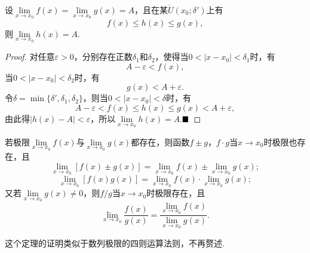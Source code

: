 \begin{theorem}[迫敛性]
	设$\lim\limits_{x\to x_0}f(x)=\lim\limits_{x\to x_0}g(x)=A$，且在某$\mathring{U}(x_0;\delta')$上有
	$$f(x)\leqslant h(x)\leqslant g(x),$$
	则$\lim\limits_{x\to x_0}h(x)=A$.
\end{theorem}
\begin{proof}
	对任意$\varepsilon>0$，分别存在正数$\delta_1$和$\delta_2$，使得当$0<|x-x_0|<\delta_1$时，有
	$$A-\varepsilon<f(x),$$
	当$0<|x-x_0|<\delta_2$时，有
	$$g(x)<A+\varepsilon.$$
	令$\delta=\min\{\delta',\delta_1,\delta_2\}$，则当$0<|x-x_0|<\delta$时，有
	$$A-\varepsilon<f(x)\leqslant h(x)\leqslant g(x)<A+\varepsilon,$$
	由此得$|h(x)-A|<\varepsilon$，所以$\lim\limits_{x\to x_0}h(x)=A$.$\hfill\blacksquare$
\end{proof}
\begin{theorem}[四则运算法则]
	若极限$\lim\limits_{x\to x_0}f(x)$与$\lim\limits_{x\to x_0}g(x)$都存在，则函数$f\pm g$，$f\cdot g$当$x\to x_0$时极限也存在，且
	$$\lim\limits_{x\to x_0}\left[f(x)\pm g(x)\right]=\lim\limits_{x\to x_0}f(x)\pm \lim\limits_{x\to x_0}g(x);$$
	$$\lim\limits_{x\to x_0}\left[f(x)g(x)\right]=\lim\limits_{x\to x_0}f(x)\cdot \lim\limits_{x\to x_0}g(x);$$
	又若$\lim\limits_{x\to x_0}g(x)\neq 0$，则$f/g$当$x\to x_0$时极限存在，且
	$$\lim\limits_{x\to x_0}\frac{f(x)}{g(x)}=\frac{\lim\limits_{x\to x_0}f(x)}{\lim\limits_{x\to x_0}g(x)}.$$
\end{theorem}
这个定理的证明类似于数列极限的四则运算法则，不再赘述.

